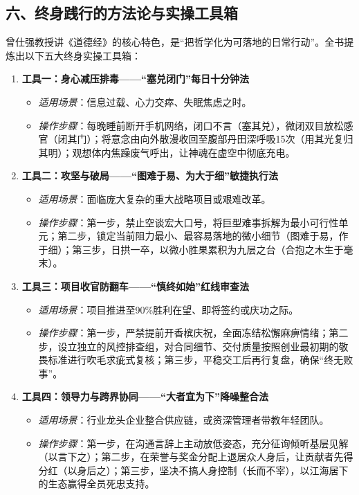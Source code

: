 \clearpage

\subsection*{六、终身践行的方法论与实操工具箱}

曾仕强教授讲《道德经》的核心特色，是“把哲学化为可落地的日常行动”。全书提炼出以下五大终身实操工具箱：

\begin{enumerate}
    \item \textbf{工具一：身心减压排毒——“塞兑闭门”每日十分钟法}
    \begin{itemize}
        \item \emph{适用场景}：信息过载、心力交瘁、失眠焦虑之时。
        \item \emph{操作步骤}：每晚睡前断开手机网络，闭口不言（塞其兑），微闭双目放松感官（闭其门）；将意念由向外散漫收回至腹部丹田深呼吸15次（用其光复归其明）；观想体内焦躁废气呼出，让神魂在虚空中彻底充电。
    \end{itemize}

    \item \textbf{工具二：攻坚与破局——“图难于易、为大于细”敏捷执行法}
    \begin{itemize}
        \item \emph{适用场景}：面临庞大复杂的重大战略项目或艰难改革。
        \item \emph{操作步骤}：第一步，禁止空谈宏大口号，将巨型难事拆解为最小可行性单元；第二步，锁定当前阻力最小、最容易落地的微小细节（图难于易，作于细）；第三步，日拱一卒，以微小胜果累积为九层之台（合抱之木生于毫末）。
    \end{itemize}

    \item \textbf{工具三：项目收官防翻车——“慎终如始”红线审查法}
    \begin{itemize}
        \item \emph{适用场景}：项目推进至90\%胜利在望、即将签约或庆功之际。
        \item \emph{操作步骤}：第一步，严禁提前开香槟庆祝，全面冻结松懈麻痹情绪；第二步，设立独立的风控排查组，对合同细节、交付质量按照创业最初期的敬畏标准进行吹毛求疵式复核；第三步，平稳交工后再行复盘，确保“终无败事”。
    \end{itemize}

    \item \textbf{工具四：领导力与跨界协同——“大者宜为下”降噪整合法}
    \begin{itemize}
        \item \emph{适用场景}：行业龙头企业整合供应链，或资深管理者带教年轻团队。
        \item \emph{操作步骤}：第一步，在沟通言辞上主动放低姿态，充分征询倾听基层见解（以言下之）；第二步，在荣誉与奖金分配上退居众人身后，让贡献者先得分红（以身后之）；第三步，坚决不搞人身控制（长而不宰），以江海居下的生态赢得全员死忠支持。
    \end{itemize}


\end{enumerate}
